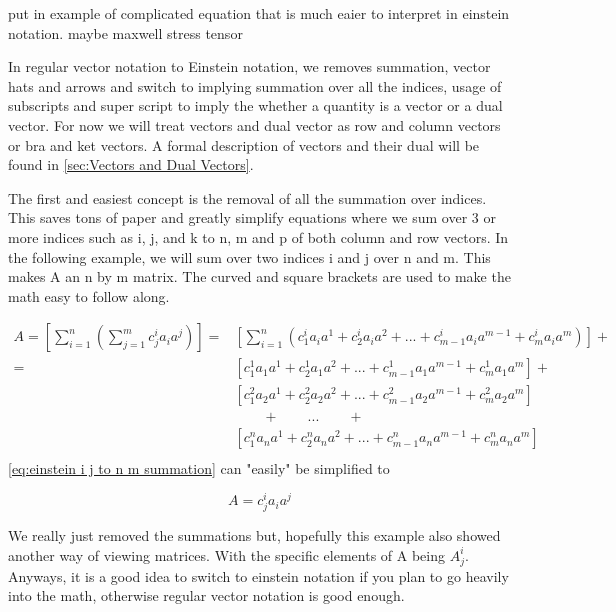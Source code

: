 \documentclass[11pt,a4paper]{book}
\begin{document}
		put in example of complicated equation that is much eaier to interpret in einstein notation. maybe maxwell stress tensor	
		
		In regular vector notation to Einstein notation, we removes summation, vector hats and arrows and switch to implying summation over all the indices, usage of subscripts and super script to imply the whether a quantity is a vector or a dual vector. For now we will treat vectors and dual vector as row and column vectors or bra and ket vectors. A formal description of vectors and their dual will be found in \autoref{sec:Vectors and Dual Vectors}.
		
		The first and easiest concept is the removal of all the summation over indices. This saves tons of paper and greatly simplify equations where we sum over 3 or more indices such as i, j, and k to n, m and p of both column and row vectors. In the following example, we will sum over two indices i and j over n and m. This makes A an n by m matrix. The curved and square brackets are used to make the math easy to follow along.
		
		\begin{equation}
			\begin{split}
				\label{eq:einstein i j to n m summation}
				A = \left[ \sum_{i=1}^{n} \left( \sum_{j=1}^{m} c_j^i a_i a^j \right) \right] 
				 = &
				\left[\sum_{i=1}^{n} 
					\left( 
						c_1^i a_i a^1 + c_2^i a_i a^2 +...+ c_{m-1}^i a_i a^{m-1} +c_m^i a_i a^m 
					\right) 
				\right] + \\
				 = &\left[ c_1^1 a_1 a^1 + c_2^1 a_1 a^2 +...+c_{m-1}^1 a_1 a^{m-1}+c_m^1 a_1 a^m \right] + \\
				& \left[ c_1^2 a_2 a^1 + c_2^2 a_2 a^2 +...+c_{m-1}^2 a_2 a^{m-1}+c_m^2 a_2 a^m  \right] \\
				& \qquad + \qquad ... \qquad+ \\
				& \left[ c_1^n a_n a^1 + c_2^n a_n a^2 +...+c_{m-1}^n a_n a^{m-1}+c_m^n a_n a^m  \right] \\
			\end{split}
		\end{equation}
		\autoref{eq:einstein i j to n m summation} can "easily" be simplified to 
		
		\begin{equation}
			\label{eq:einstein i j to n m no summation}
			A=c_j^i a_i a^j
		\end{equation}
		
		\noindent
		We really just removed the summations but, hopefully this example also showed another way of viewing matrices. With the specific elements of A being $A^i_j$. Anyways, it is a good idea to switch to einstein notation if you plan to go heavily into the math, otherwise regular vector notation is good enough.
\end{document}
